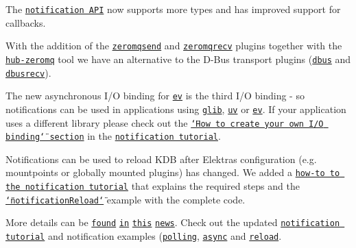 \begin{DoxyItemize}
\item The \href{https://doc.libelektra.org/api/latest/html/group__kdbnotification.html}{\tt notification A\+PI} now supports more types and has improved support for callbacks.
\item With the addition of the \href{https://www.libelektra.org/plugins/zeromqsend}{\tt zeromqsend} and \href{https://www.libelektra.org/plugins/zeromqrecv}{\tt zeromqrecv} plugins together with the \href{https://www.libelektra.org/tools/hub-zeromq}{\tt hub-\/zeromq} tool we have an alternative to the D-\/\+Bus transport plugins (\href{https://www.libelektra.org/plugins/dbus}{\tt dbus} and \href{https://www.libelektra.org/plugins/dbusrecv}{\tt dbusrecv}).
\item The new asynchronous I/O binding for \href{https://www.libelektra.org/bindings/io_ev}{\tt ev} is the third I/O binding -\/ so notifications can be used in applications using \href{https://www.libelektra.org/bindings/io_glib}{\tt glib}, \href{https://www.libelektra.org/bindings/io_uv}{\tt uv} or \href{https://www.libelektra.org/bindings/io_ev}{\tt ev}. If your application uses a different library please check out the \href{https://www.libelektra.org/tutorials/notifications#how-to-create-your-own-i-o-binding}{\tt \char`\"{}\+How to create your own I/\+O binding\char`\"{} section} in the \href{https://www.libelektra.org/tutorials/notifications}{\tt notification tutorial}.
\item Notifications can be used to reload K\+DB after Elektra\textquotesingle{}s configuration (e.\+g. mountpoints or globally mounted plugins) has changed. We added a \href{https://www.libelektra.org/tutorials/notifications#howto-reload-kdb-when-elektras-configuration-has-changed}{\tt how-\/to to the notification tutorial} that explains the required steps and the \href{https://www.libelektra.org/examples/notificationreload}{\tt \char`\"{}notification\+Reload\char`\"{}} example with the complete code.
\end{DoxyItemize}

More details can be \href{#zeromq-transport-plugins}{\tt found} \href{#misc}{\tt in} \href{#bindings}{\tt this} \href{#notifications}{\tt news}. Check out the updated \href{https://www.libelektra.org/tutorials/notifications}{\tt notification tutorial} and notification examples (\href{https://www.libelektra.org/examples/notificationpolling}{\tt polling}, \href{https://www.libelektra.org/examples/notificationasync}{\tt async} and \href{https://www.libelektra.org/examples/notificationreload}{\tt reload}.

